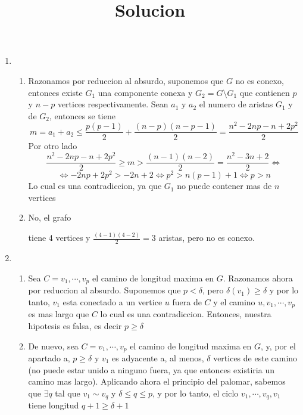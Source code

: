 \documentclass{article}
\begin{document}
\newpage
\title{Solucion}
\date{}
\maketitle

\begin{enumerate}
\item \begin{enumerate}
\item Razonamos por reduccion al absurdo, suponemos que $G$ no es conexo, entonces existe
$G_1$ una componente conexa y $G_2 = G \setminus G_1$ que contienen $p$ y $n-p$ vertices
respectivamente. Sean $a_1$ y $a_2$ el numero de aristas $G_1$ y de $G_2$,
entonces se tiene
\[
m = a_1 + a_2 \leq \frac{p(p-1)}{2} + \frac{(n-p)(n-p-1)}{2} = \frac{n^2 -2np -n +2p^2}{2}
\]
Por otro lado
\[
 \frac{n^2 -2np -n +2p^2}{2} \geq m > \frac{(n-1)(n-2)}{2} = \frac{n^2-3n+2}{2} \iff
 \]
 \[
 \iff
 -2np +2p^2 > -2n + 2
 \iff
 p^2 > n(p-1) + 1
 \iff p > n
\]
Lo cual es una contradiccion, ya que $G_1$ no puede contener mas de $n$ vertices
\item No, el grafo

\begin{center}\end{center}
tiene 4 vertices y $\frac{(4-1)(4-2)}{2}=3$ aristas, pero no es conexo.
\end{enumerate}




\item \begin{enumerate}
\item Sea $C = v_1, \cdots, v_p$ el camino de longitud maxima en $G$. Razonamos ahora por reduccion
al absurdo. Suponemos que $p < \delta$, pero $\delta(v_1) \geq \delta$ y por lo tanto, $v_1$ esta
conectado a un vertice $u$ fuera de $C$ y el camino $u, v_1, \cdots, v_p$ es mas largo que
$C$ lo cual es una contradiccion. Entonces, nuestra hipotesis es falsa, es decir $p \geq \delta$

\item De nuevo, sea $C = v_1, \cdots, v_p$ el camino de longitud maxima en $G$, y, por el apartado a, $p \geq \delta$ y $v_1$ es adyacente a, al menos, $\delta$ vertices de este camino (no puede
estar unido a ninguno fuera, ya que entonces existiria un camino mas largo). Aplicando ahora el
principio del palomar, sabemos que $\exists q$ tal que $v_1 \sim v_q$ y $\delta \leq q \leq p$, y por lo
tanto, el ciclo $v_1, \cdots, v_q, v_1$ tiene longitud $q+1 \geq \delta + 1$ 
\end{enumerate}



\end{enumerate}
\end{document}
